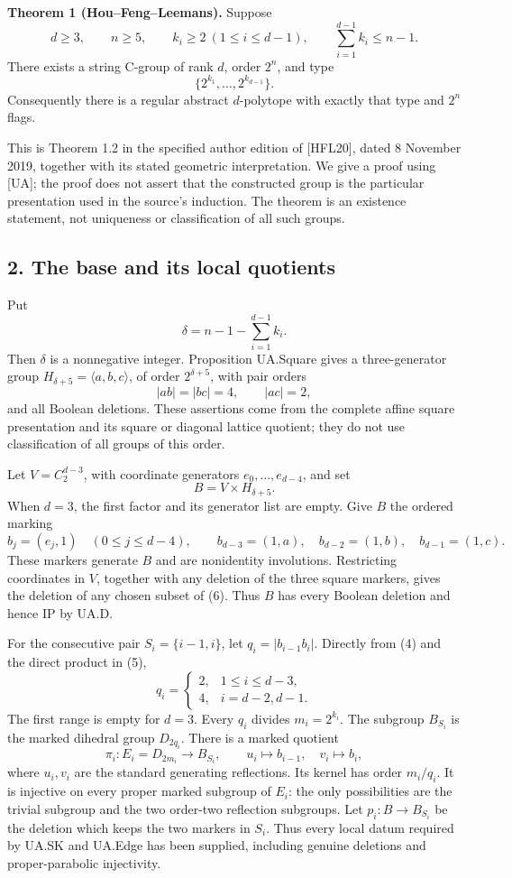 \documentclass[
  11pt,
  a4paper,
]{article}
\begin{document}
\textbf{Theorem 1 (Hou--Feng--Leemans).} Suppose \[
d\ge3,\qquad n\ge5,\qquad k_i\ge2\ (1\le i\le d-1),\qquad
\sum_{i=1}^{d-1}k_i\le n-1.
\tag{1}
\] There exists a string C-group of rank \(d\), order \(2^n\), and type
\[
\{2^{k_1},\ldots,2^{k_{d-1}}\}.
\tag{2}
\] Consequently there is a regular abstract \(d\)-polytope with exactly
that type and \(2^n\) flags.

This is Theorem 1.2 in the specified author edition of {[}HFL20{]},
dated 8 November 2019, together with its stated geometric
interpretation. We give a proof using {[}UA{]}; the proof does not
assert that the constructed group is the particular presentation used in
the source's induction. The theorem is an existence statement, not
uniqueness or classification of all such groups.

\subsection{2. The base and its local
quotients}\label{the-base-and-its-local-quotients}

Put \[
\delta=n-1-\sum_{i=1}^{d-1}k_i.
\tag{3}
\] Then \(\delta\) is a nonnegative integer. Proposition UA.Square gives
a three-generator group \(H_{\delta+5}=\langle a,b,c\rangle\), of order
\(2^{\delta+5}\), with pair orders \[
|ab|=|bc|=4,\qquad |ac|=2,
\tag{4}
\] and all Boolean deletions. These assertions come from the complete
affine square presentation and its square or diagonal lattice quotient;
they do not use classification of all groups of this order.

Let \(V=C_2^{d-3}\), with coordinate generators \(e_0,\ldots,e_{d-4}\),
and set \[
B=V\times H_{\delta+5}.
\tag{5}
\] When \(d=3\), the first factor and its generator list are empty. Give
\(B\) the ordered marking \[
b_j=(e_j,1)\quad(0\le j\le d-4),\qquad
b_{d-3}=(1,a),\quad b_{d-2}=(1,b),\quad b_{d-1}=(1,c).
\tag{6}
\] These markers generate \(B\) and are nonidentity involutions.
Restricting coordinates in \(V\), together with any deletion of the
three square markers, gives the deletion of any chosen subset of (6).
Thus \(B\) has every Boolean deletion and hence IP by UA.D.

For the consecutive pair \(S_i=\{i-1,i\}\), let \(q_i=|b_{i-1}b_i|\).
Directly from (4) and the direct product in (5), \[
q_i=\begin{cases}
2,&1\le i\le d-3,\\
4,&i=d-2,d-1.
\end{cases}
\tag{7}
\] The first range is empty for \(d=3\). Every \(q_i\) divides
\(m_i=2^{k_i}\). The subgroup \(B_{S_i}\) is the marked dihedral group
\(D_{2q_i}\). There is a marked quotient \[
\pi_i:E_i=D_{2m_i}\longrightarrow B_{S_i},\qquad
u_i\longmapsto b_{i-1},\quad v_i\longmapsto b_i,
\tag{8}
\] where \(u_i,v_i\) are the standard generating reflections. Its kernel
has order \(m_i/q_i\). It is injective on every proper marked subgroup
of \(E_i\): the only possibilities are the trivial subgroup and the two
order-two reflection subgroups. Let \(p_i:B\to B_{S_i}\) be the deletion
which keeps the two markers in \(S_i\). Thus every local datum required
by UA.SK and UA.Edge has been supplied, including genuine deletions and
proper-parabolic injectivity.
\end{document}
